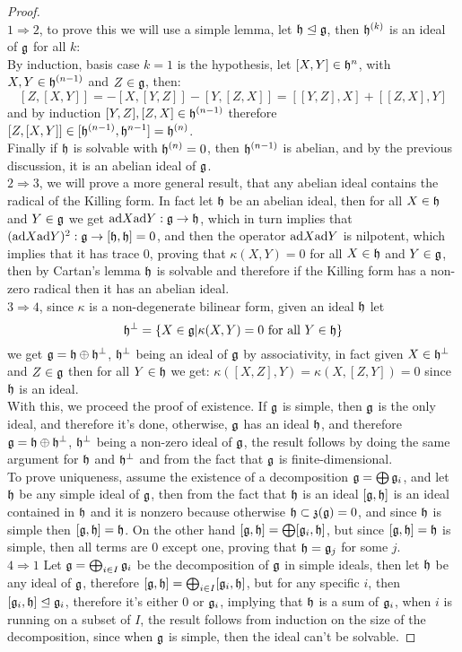 \begin{proof}\\
	$1 \Rightarrow 2$, to prove this we will use a simple lemma, let $\mathfrak{h} \trianglelefteq \mathfrak{g}$, then $\mathfrak{h}^{(k)}$ is an ideal of $\mathfrak{g}$ for all $k$:\\
	By induction, basis case $k=1$ is the hypothesis, let $[X,Y] \in \mathfrak{h}^{n}$, with $X,Y \in \mathfrak{h}^{(n-1)}$ and $Z \in \mathfrak{g}$, then:
	$$[Z,[X,Y]] = -[X,[Y,Z]]-[Y,[Z,X]] = [[Y,Z],X] + [[Z,X],Y]$$
	and by induction $[Y,Z],[Z,X]\in \mathfrak{h}^{(n-1)}$ therefore $[Z,[X,Y]] \in [\mathfrak{h}^{(n-1)},\mathfrak{h}^{n-1}] = \mathfrak{h}^{(n)}$.\\
	Finally if $\mathfrak{h}$ is solvable with $\mathfrak{h}^{(n)}=0$, then $\mathfrak{h}^{(n-1)}$ is abelian, and by the previous discussion, it is an abelian ideal of $\mathfrak{g}$.\\
	$2 \Rightarrow 3$, we will prove a more general result, that any abelian ideal contains the radical of the Killing form. In fact let $\mathfrak{h}$ be an abelian ideal, then for all $X \in \mathfrak{h}$ and $Y \in \mathfrak{g}$ we get $\text{ad} X \text{ad} Y : \mathfrak{g} \rightarrow \mathfrak{h}$, which in turn implies that $(\text{ad} X \text{ad} Y)^2 : \mathfrak{g} \rightarrow [\mathfrak{h},\mathfrak{h}] = 0$, and then the operator $\text{ad} X \text{ad} Y$ is nilpotent, which implies that it has trace $0$, proving that $\kappa(X,Y)=0$ for all $X \in \mathfrak{h}$ and $Y \in \mathfrak{g}$, then by Cartan's lemma $\mathfrak{h}$ is solvable and therefore if the Killing form has a non-zero radical then it has an abelian ideal.\\
	$3 \Rightarrow 4$, since $\kappa$ is a non-degenerate bilinear form, given an ideal $\mathfrak{h}$ let $$\mathfrak{h}^\perp = \{X \in \mathfrak{g} | \kappa(X,Y)=0 \text{ for all } Y \in \mathfrak{h}\}$$ we get $\mathfrak{g} = \mathfrak{h} \oplus \mathfrak{h}^\perp$, $\mathfrak{h}^\perp$ being an ideal of $\mathfrak{g}$ by associativity, in fact given $X\in \mathfrak{h}^\perp$ and $Z \in \mathfrak{g}$ then for all $Y \in \mathfrak{h}$ we get: $\kappa([X,Z],Y) = \kappa(X,[Z,Y])=0$ since $\mathfrak{h}$ is an ideal.\\
	With this, we proceed the proof of existence. If $\mathfrak{g}$ is simple, then $\mathfrak{g}$ is the only ideal, and therefore it's done, otherwise, $\mathfrak{g}$ has an ideal $\mathfrak{h}$, and therefore $\mathfrak{g} = \mathfrak{h} \oplus \mathfrak{h}^\perp$, $\mathfrak{h}^\perp$ being a non-zero ideal of $\mathfrak{g}$, the result follows by doing the same argument for $\mathfrak{h}$ and $\mathfrak{h}^\perp$ and from the fact that $\mathfrak{g}$ is finite-dimensional.\\
	To prove uniqueness, assume the existence of a decomposition $\mathfrak{g} = \bigoplus \mathfrak{g}_i$, and let $\mathfrak{h}$ be any simple ideal of $\mathfrak{g}$, then from the fact that $\mathfrak{h}$ is an ideal $[\mathfrak{g},\mathfrak{h}]$ is an ideal contained in $\mathfrak{h}$ and it is nonzero because otherwise $\mathfrak{h}\subset \mathfrak{z}(\mathfrak{g})=0$, and since $\mathfrak{h}$ is simple then $[\mathfrak{g},\mathfrak{h}]=\mathfrak{h}$. On the other hand $[\mathfrak{g},\mathfrak{h}]=\bigoplus[\mathfrak{g}_i,\mathfrak{h}]$, but since $[\mathfrak{g},\mathfrak{h}]=\mathfrak{h}$ is simple, then all terms are $0$ except one, proving that $\mathfrak{h}=\mathfrak{g}_j$ for some $j$.\\
	$4 \Rightarrow 1$ Let $\mathfrak{g}= \bigoplus_{i \in I} \mathfrak{g}_i$ be the decomposition of $\mathfrak{g}$ in simple ideals, then let $\mathfrak{h}$ be any ideal of $\mathfrak{g}$, therefore $[\mathfrak{g},\mathfrak{h}] = \bigoplus_{i \in I} [\mathfrak{g}_i,\mathfrak{h}]$, but for any specific $i$, then $[\mathfrak{g}_i,\mathfrak{h}]\trianglelefteq \mathfrak{g}_i$, therefore it's either $0$ or $\mathfrak{g}_i$, implying that $\mathfrak{h}$ is a sum of $\mathfrak{g}_i$, when $i$ is running on a subset of $I$, the result follows from induction on the size of the decomposition, since when $\mathfrak{g}$ is simple, then the ideal can't be solvable.
\end{proof}
